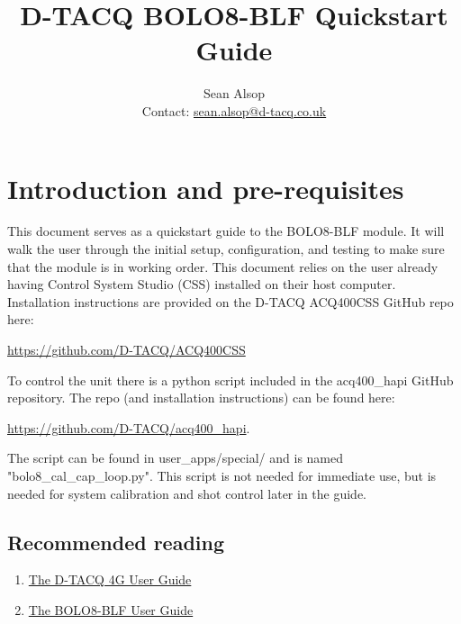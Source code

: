 \documentclass{article}
\begin{document}
\title{D-TACQ BOLO8-BLF Quickstart Guide}
\author{Sean Alsop \\ Contact: \href{mailto:sean.alsop@d-tacq.co.uk}{sean.alsop@d-tacq.co.uk} }

\maketitle


\tableofcontents

\section{Introduction and pre-requisites}
This document serves as a quickstart guide to the BOLO8-BLF module.
It will walk the user through the initial setup, configuration, and testing to make sure that the module is in working order.
This document relies on the user already having Control System Studio (CSS) installed on their host computer.
Installation instructions are provided on the D-TACQ ACQ400CSS GitHub repo here:
\newline
\centerline{ \href{https://github.com/D-TACQ/ACQ400CSS}{https://github.com/D-TACQ/ACQ400CSS} }
\newline
To control the unit there is a python script included in the acq400\_hapi GitHub repository.
The repo (and installation instructions) can be found here:
\newline
\centerline{ \href{https://github.com/D-TACQ/acq400_hapi}{https://github.com/D-TACQ/acq400\_hapi}. }
\newline
The script can be found in user\_apps/special/ and is named "bolo8\_cal\_cap\_loop.py".
This script is not needed for immediate use, but is needed for system calibration and shot control later in the guide.
\subsection{Recommended reading}
\begin{enumerate}
	\item \href{http://www.d-tacq.com/resources/d-tacq-4G-acq4xx-UserGuide-r28.pdf}{The D-TACQ 4G User Guide}
	\item \href{http://www.d-tacq.com/resources/Bolo_calibration_report_user-guide.pdf}{The BOLO8-BLF User Guide}
\end{enumerate}
\end{document}
